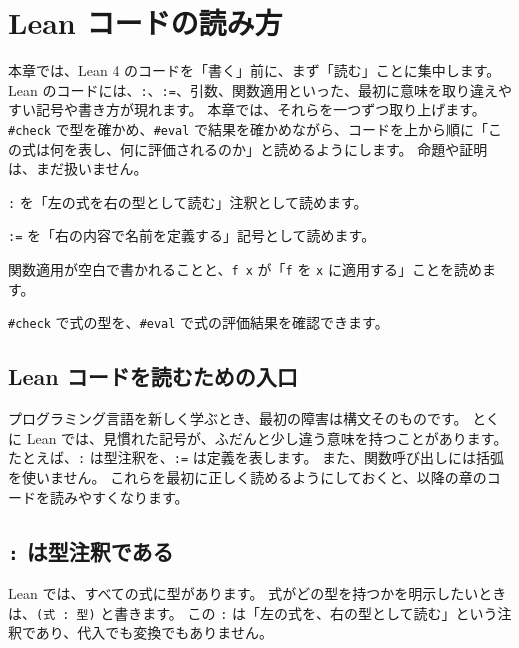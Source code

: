 \chapter{Lean コードの読み方}
\label{chap:ch01_reading_code}

\begin{chapterabstract}
本章では、Lean 4 のコードを「書く」前に、まず「読む」ことに集中します。
Lean のコードには、\texttt{:}、\texttt{:=}、引数、関数適用といった、最初に意味を取り違えやすい記号や書き方が現れます。
本章では、それらを一つずつ取り上げます。
\texttt{\#check} で型を確かめ、\texttt{\#eval} で結果を確かめながら、コードを上から順に「この式は何を表し、何に評価されるのか」と読めるようにします。
命題や証明は、まだ扱いません。
\end{chapterabstract}

\begin{learninggoals}
\item \texttt{:} を「左の式を右の型として読む」注釈として読めます。
\item \texttt{:=} を「右の内容で名前を定義する」記号として読めます。
\item 関数適用が空白で書かれることと、\texttt{f x} が「\texttt{f} を \texttt{x} に適用する」ことを読めます。
\item \texttt{\#check} で式の型を、\texttt{\#eval} で式の評価結果を確認できます。
\end{learninggoals}

\section{Lean コードを読むための入口}

プログラミング言語を新しく学ぶとき、最初の障害は構文そのものです。
とくに Lean では、見慣れた記号が、ふだんと少し違う意味を持つことがあります。
たとえば、\texttt{:} は型注釈を、\texttt{:=} は定義を表します。
また、関数呼び出しには括弧を使いません。
これらを最初に正しく読めるようにしておくと、以降の章のコードを読みやすくなります。

\section{\texttt{:} は型注釈である}

Lean では、すべての式に型があります。
式がどの型を持つかを明示したいときは、\texttt{(式 : 型)} と書きます。
この \texttt{:} は「左の式を、右の型として読む」という注釈であり、代入でも変換でもありません。


